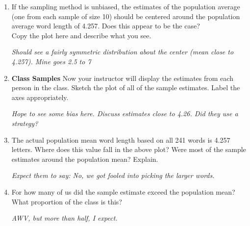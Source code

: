 \begin{enumerate}
     \item  If the sampling method is unbiased, the estimates of the
       population average (one from each sample of size 10) should be
       centered around the population average word length of 4.257.
       Does this appear to be the case? \\
        Copy the plot here and describe what you see.       
\begin{students}
  \vspace{3cm}
\end{students}    
\begin{key}
   {\it Should see a fairly symmetric distribution about the center
     (mean close to 4.257).  Mine goes 2.5 to 7}
\end{key}



     \item\label{classPlot} {\bf Class Samples} Now your instructor will
       display the  estimates from each person in the class. 
        Sketch the plot of all of the sample estimates. 
        Label the axes appropriately.       
\begin{students}
  \vspace{4cm}
\end{students}    
\begin{key}
   {\it Hope to see some bias here.  Discuss estimates close to
     4.26. Did they use a strategy?}
\end{key}

      \item  The actual population mean word length based on all 241
        words is 4.257 letters. Where does this value fall in the
        above plot? Were most of the sample estimates around the
        population mean? Explain. 
\begin{students}
  \vspace{1cm}
\end{students}    
\begin{key}
   {\it Expect them to say: No, we got fooled into picking the larger words.}
\end{key}     

     \item\label{medUnbiased} For how many of us did the sample
       estimate exceed the population mean? What proportion of the
       class is this?        
\begin{students}
  \vspace{1cm}
\end{students}    
\begin{key}
   {\it AWV, but more than half, I expect.}
\end{key}


\end{enumerate}

